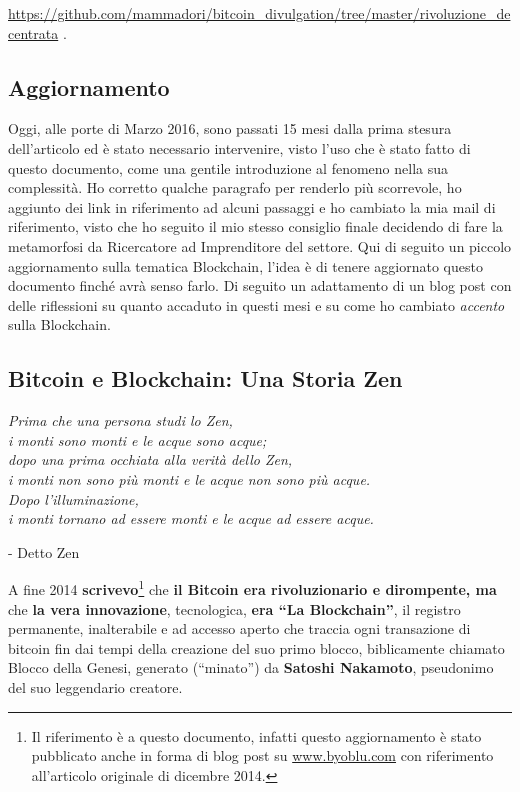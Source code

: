 \documentclass[a4paper,12pt,italian]{article}
\newcommand{\longurl}[1]{%
\href{#1}{\ttfamily \smaller #1}%
}%
\begin{document}
\noindent
\longurl{https://github.com/mammadori/bitcoin\_divulgation/tree/master/rivoluzione\_decentrata}.

\pagebreak 

\subsection*{Aggiornamento}

Oggi, alle porte di Marzo 2016, sono passati 15 mesi dalla prima stesura dell'articolo ed è stato necessario intervenire,
visto l'uso che è stato fatto di questo documento, come una gentile introduzione al fenomeno nella sua complessità.
Ho corretto qualche paragrafo per renderlo più scorrevole, ho aggiunto dei link in riferimento ad alcuni passaggi 
e ho cambiato la mia mail di riferimento, visto che ho seguito il mio stesso consiglio finale decidendo di fare la metamorfosi 
da Ricercatore ad Imprenditore del settore. Qui di seguito un piccolo aggiornamento sulla tematica Blockchain,
l'idea è di tenere aggiornato questo documento finché avrà senso farlo. Di seguito un adattamento di 
un blog post con delle riflessioni su quanto accaduto in questi mesi e su come ho cambiato \emph{accento} sulla Blockchain.

\pagebreak

\begin{center}
\section*{Bitcoin e Blockchain: Una Storia Zen}
\end{center}



 \setlength{\epigraphwidth}{.5\textwidth}

\epigraph{\textit{Prima che una persona studi lo Zen, \\
i monti sono monti 
e le acque sono acque; \\
dopo una prima occhiata alla verità dello Zen, \\
i monti non sono più monti 
e le acque non sono più acque. \\
\smallskip 
Dopo l'illuminazione, \\
i monti tornano ad essere monti 
e le acque ad essere acque.}}{{}- Detto Zen}


\bigskip


A fine 2014 \textbf{scrivevo}\footnote{Il riferimento è a questo documento, infatti questo aggiornamento è stato pubblicato anche in forma di blog post su \url{www.byoblu.com} con riferimento all'articolo originale di dicembre 2014.} che \textbf{il Bitcoin era rivoluzionario e
dirompente, ma} che \textbf{la vera innovazione}, tecnologica, \textbf{era “La
Blockchain”}, il registro permanente, inalterabile e ad accesso aperto che traccia ogni transazione di bitcoin
fin dai tempi della creazione del suo primo blocco, biblicamente chiamato Blocco della Genesi, generato (“minato”) da
\textbf{Satoshi Nakamoto}, pseudonimo del suo leggendario creatore.
\end{document}
